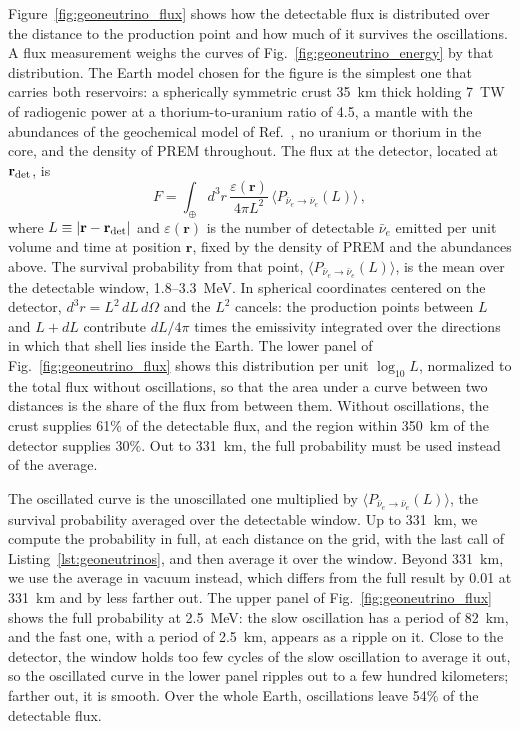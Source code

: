 \documentclass[final,5p,times,twocolumn,sort,compress]{elsarticle}
\makeatletter
\newcommand{\fig}{Fig.}
\DeclareRobustCommand{\_}{%
  \ifmmode\nfss@text{\textunderscore}\else\textunderscore\allowbreak\fi}
\newcommand{\figu}[1]{\fig~\ref{fig:#1}}
\makeatother
\begin{document}
Figure~\ref{fig:geoneutrino_flux} shows how the detectable flux is distributed over the distance to the production point and how much of it survives the oscillations. A flux measurement weighs the curves of \figu{geoneutrino_energy} by that distribution. The Earth model chosen for the figure is the simplest one that carries both reservoirs: a spherically symmetric crust 35~km thick holding 7~TW of radiogenic power at a thorium-to-uranium ratio of 4.5, a mantle with the abundances of the geochemical model of Ref.~\cite{Bellini:2013wsa}, no uranium or thorium in the core, and the density of PREM throughout. The flux at the detector, located at $\mathbf{r}_{\rm det}$, is
\begin{equation}
 F = \int_\oplus d^3r \, \frac{\varepsilon(\mathbf{r})}{4 \pi L^2} \, \langle P_{\bar\nu_e \to \bar\nu_e} (L) \rangle \,,
 \label{equ:geoflux}
\end{equation}
where $L \equiv \lvert \mathbf{r} - \mathbf{r}_{\rm det} \rvert$ and $\varepsilon(\mathbf{r})$ is the number of detectable $\bar{\nu}_e$ emitted per unit volume and time at position $\mathbf{r}$, fixed by the density of PREM and the abundances above. The survival probability from that point, $\langle P_{\bar\nu_e \to \bar\nu_e}(L) \rangle$, is the mean over the detectable window, 1.8--3.3~MeV. In spherical coordinates centered on the detector, $d^3r = L^2 \, dL \, d\Omega$ and the $L^2$ cancels: the production points between $L$ and $L + dL$ contribute $dL / 4\pi$ times the emissivity integrated over the directions in which that shell lies inside the Earth. The lower panel of \figu{geoneutrino_flux} shows this distribution per unit $\log_{10} L$, normalized to the total flux without oscillations, so that the area under a curve between two distances is the share of the flux from between them. Without oscillations, the crust supplies 61\% of the detectable flux, and the region within 350~km of the detector supplies 30\%. Out to 331~km, the full probability must be used instead of the average.

The oscillated curve is the unoscillated one multiplied by $\langle P_{\bar\nu_e \to \bar\nu_e}(L) \rangle$, the survival probability averaged over the detectable window. Up to 331~km, we compute the probability in full, at each distance on the grid, with the last call of Listing~\ref{lst:geoneutrinos}, and then average it over the window. Beyond 331~km, we use the average in vacuum instead, which differs from the full result by 0.01 at 331~km and by less farther out. The upper panel of \figu{geoneutrino_flux} shows the full probability at 2.5~MeV: the slow oscillation has a period of 82~km, and the fast one, with a period of 2.5~km, appears as a ripple on it. Close to the detector, the window holds too few cycles of the slow oscillation to average it out, so the oscillated curve in the lower panel ripples out to a few hundred kilometers; farther out, it is smooth. Over the whole Earth, oscillations leave 54\% of the detectable flux.
\end{document}

